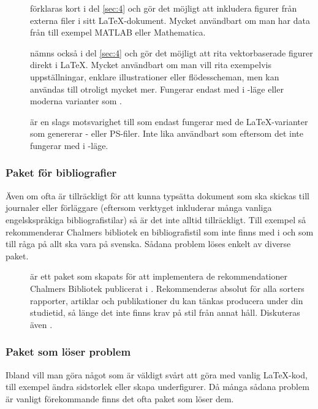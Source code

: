 \documentclass[../../latex.tex]{subfiles}
\begin{document}
\begin{description}
	\item[]
	förklaras kort i del \vref{sec:4} och gör det möjligt att inkludera
	figurer från externa filer i sitt \LaTeX-dokument. Mycket användbart
	om man har data från till exempel MATLAB eller Mathematica.
	
	\item[]
	nämns också i del \ref{sec:4} och gör det möjligt att rita
	vektorbaserade figurer direkt i \LaTeX. Mycket användbart om man
	vill rita exempelvis uppställningar, enklare illustrationer eller 
	flödesscheman, men kan användas till otroligt mycket mer. Fungerar
	endast med \pdfLaTeX{} i \PDF-läge eller moderna varianter som
	\XeTeX.

	\item[]
	är en slags motsvarighet till  som endast fungerar med de
	\LaTeX-varianter som genererar \DVI- eller \textsc{PS}-filer. Inte
	lika användbart som  eftersom det inte fungerar med 
	\pdfLaTeX{} i \PDF-läge.
\end{description}

\subsubsection{Paket för bibliografier}
Även om \BibTeX ofta är tillräckligt för att kunna typsätta dokument som
ska skickas till journaler eller förläggare (eftersom verktyget
inkluderar många vanliga engelskspråkiga bibliografistilar) så är det inte
alltid tillräckligt. Till exempel så rekommenderar Chalmers bibliotek
en bibliografistil som inte finns med i \BibTeX och som till råga på allt
ska vara på svenska. Sådana problem löses enkelt av diverse paket.

\begin{description}
	\item[\emph{}]
	är ett paket som skapats för att implementera de rekommendationer
	Chalmers Bibliotek publicerat \cite{ChsLib10} i \BibTeX.
	Rekommenderas absolut för alla sorters rapporter, artiklar och
	publikationer du kan tänkas producera under din studietid, så länge
	det inte finns krav på stil från annat håll. Diskuteras även
	.
\end{description}

\subsubsection{Paket som löser problem}
Ibland vill man göra något som är väldigt svårt att göra med vanlig
\LaTeX-kod, till exempel ändra sidstorlek eller skapa underfigurer. Då
många sådana problem är vanligt förekommande finns det ofta paket som
löser dem.
\end{document}
